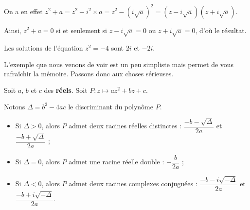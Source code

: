 \documentclass[11pt,fleqn, openany]{book} %
\begin{document}
\begin{demonstration}On a en effet $z^2+a=z^2-i^2\times a = z^2 - (i\sqrt{a})^2=(z-i\sqrt{a})(z+i\sqrt{a})$.

Ainsi, $z^2+a=0$ si et seulement si $z-i\sqrt{a}=0$ ou $z+i\sqrt{a}=0$, d'où le résultat.\end{demonstration}


\begin{example}Les solutions de l'équation $z^2=-4$ sont $2i$ et $-2i$.\end{example}

L'exemple que nous venons de voir est un peu simpliste mais permet de vous rafraîchir la mémoire. Passons donc aux choses sérieuses.

\newpage

\begin{theorem}Soit $a$, $b$ et $c$ des \textbf{réels}. Soit $P : z \mapsto az^2+bz+c$.

Notons $\Delta = b^2-4ac$ le discriminant du polynôme $P$.
\begin{itemize}
\item Si $\Delta >0$, alors $P$ admet deux racines réelles distinctes : $\dfrac{-b-\sqrt{\Delta}}{2a}$ et $\dfrac{-b+\sqrt{\Delta}}{2a}$ ;
\item Si $\Delta = 0$, alors $P$ admet une racine réelle double : $-\dfrac{b}{2a}$ ;
\item Si $\Delta <0$, alors $P$ admet deux racines complexes conjuguées : $\dfrac{-b-i\sqrt{-\Delta}}{2a}$ et $\dfrac{-b+i\sqrt{-\Delta}}{2a}$.
\end{itemize}
\end{theorem}
\end{document}
